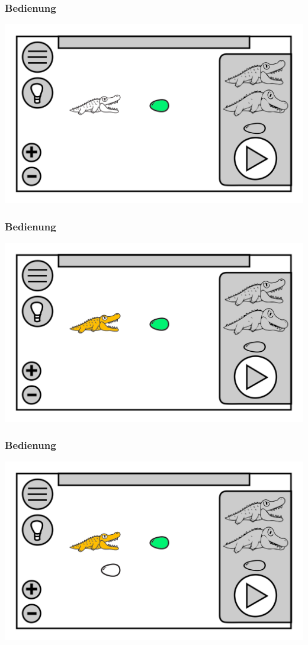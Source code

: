 \documentclass[t]{beamer}
\begin{document}
\begin{frame}
	\frametitle{Bedienung}
	\includegraphics[height=\textheight]{level_croc.png}
\end{frame}
\begin{frame}
	\frametitle{Bedienung}
	\includegraphics[height=\textheight]{level_colored_croc.png}
\end{frame}
\begin{frame}
	\frametitle{Bedienung}
	\includegraphics[height=\textheight]{level_colored_croc0.png}
\end{frame}
\end{document}
